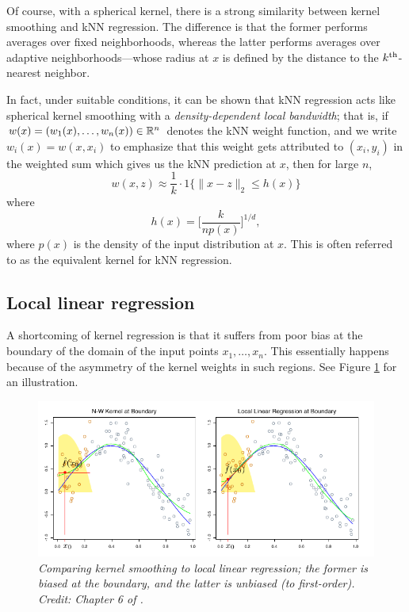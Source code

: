 \documentclass{article}
\begin{document}
Of course, with a spherical kernel, there is a strong similarity between kernel
smoothing and kNN regression. The difference is that the former performs
averages over fixed neighborhoods, whereas the latter performs averages over
adaptive neighborhoods---whose radius at $x$ is defined by the distance to the
$k^{\text{th}}$-nearest neighbor.

In fact, under suitable conditions, it can be shown that kNN regression acts
like spherical kernel smoothing with a \emph{density-dependent local bandwidth}; 
that is, if $w(x) = (w_1(x), \dots, w_n(x)) \in \mathbb{R}^n$ denotes the kNN weight
function, and we write $w_i(x) = w(x, x_i)$ to emphasize that this weight gets
attributed to $(x_i, y_i)$ in the weighted sum  which gives us the kNN prediction at $x$, then for large $n$, 
\[
w(x, z) \approx \frac{1}{k} \cdot 1\{ \|x - z\|_2 \leq h(x) \} 
\]
where 
\[
h(x) = \bigg[ \frac{k}{n p(x)} \bigg]^{1/d},
\]
where $p(x)$ is the density of the input distribution at $x$. This is often
referred to as the equivalent kernel for kNN regression.  

\subsection{Local linear regression}

A shortcoming of kernel regression is that it suffers from poor bias at the
boundary of the domain of the input points $x_1,\dots,x_n$. This essentially
happens because of the asymmetry of the kernel weights in such regions. See
Figure \ref{fig:bias} for an illustration. 

\begin{figure}[tb]
\centering
\includegraphics[width=\textwidth]{bias.pdf}
\caption{\it Comparing kernel smoothing to local linear regression; the former
  is biased at the boundary, and the latter is unbiased (to
  first-order). Credit: Chapter 6 of \citet{hastie2009elements}.}  
\label{fig:bias}
\end{figure}
\end{document}
